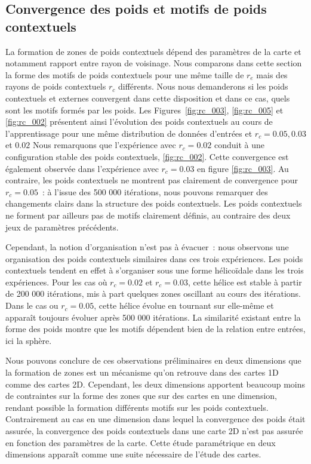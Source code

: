 \documentclass[../main]{subfiles}
\begin{document}
\subsection{Convergence des poids et motifs de poids contextuels}

La formation de zones de poids contextuels dépend des paramètres de la carte et notamment  rapport entre rayon de voisinage.
Nous comparons dans cette section la forme des motifs de poids contextuels pour une même taille de $r_e$ mais des rayons de poids contextuels $r_c$ différents.
Nous nous demanderons si les poids contextuels et externes convergent dans cette disposition et dans ce cas, quels sont les motifs formés par les poids.
Les Figures~\ref{fig:rc_003}, \ref{fig:rc_005} et \ref{fig:rc_002} présentent ainsi l'évolution des poids contextuels au cours de l'apprentissage pour une même distribution de données d'entrées et $r_c = 0.05, 0.03$ et $0.02$
Nous remarquons que l'expérience avec $r_c = 0.02$ conduit à une configuration stable des poids contextuels, \ref{fig:rc_002}. Cette convergence est également observée dans l'expérience avec $r_c = 0.03$ en figure \ref{fig:rc_003}. Au contraire, les poids contextuels ne montrent pas clairement de convergence pour $r_c =0.05$~: à l'issue des 500 000 itérations, nous pouvons remarquer des changements clairs dans la structure des poids contextuels. Les poids contextuels ne forment par ailleurs pas de motifs clairement définis, au contraire des deux jeux de paramètres précédents.

Cependant, la notion d'organisation n'est pas à évacuer~: nous observons une organisation des poids contextuels similaires dans ces trois expériences. Les poids contextuels tendent en effet à s'organiser sous une forme hélicoïdale dans les trois expériences. Pour les cas où $r_c = 0.02$ et $r_c = 0.03$, cette hélice est stable à partir de 200 000 itérations, mis à part quelques zones oscillant au cours des itérations. 
Dans le cas ou $r_c = 0.05$, cette hélice évolue en tournant sur elle-même et apparaît toujours évoluer après 500 000 itérations.
La similarité existant entre la forme des poids montre que les motifs dépendent bien de la relation entre entrées, ici la sphère.

Nous pouvons conclure de ces observations préliminaires en deux dimensions que la formation de zones est un mécanisme qu'on retrouve dans des cartes 1D comme des cartes 2D.
Cependant, les deux dimensions apportent beaucoup moins de contraintes sur la forme des zones que sur des cartes en une dimension, rendant possible la formation différents motifs sur les poids contextuels. 
Contrairement au cas en une dimension dans lequel la convergence des poids était assurée, la convergence des poids contextuels dans une carte 2D n'est pas assurée en fonction des paramètres de la carte. Cette étude paramétrique en deux dimensions apparaît comme une suite nécessaire de l'étude des cartes.
\end{document}
